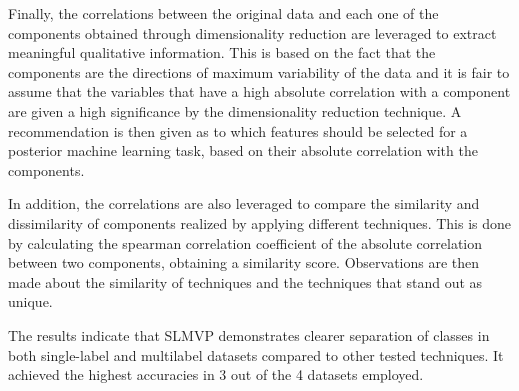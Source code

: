 Finally, the correlations between the original data and each one of the components obtained through dimensionality reduction  are leveraged to extract meaningful qualitative information. This is based on the fact that the components are the directions of maximum variability of the data and it is fair to assume that the variables that have a high absolute correlation with a component are given a high significance by the dimensionality reduction technique.
A recommendation is then given as to which features should be selected for a posterior machine learning task, based on their absolute correlation with the components.

In addition, the correlations are also leveraged to compare the similarity and dissimilarity of components realized by applying different techniques. This is done by calculating the spearman correlation coefficient of the absolute correlation between two components, obtaining a similarity score. Observations are then made about the similarity of techniques and the techniques that stand out as unique.

The results indicate that SLMVP demonstrates clearer separation of classes in both single-label and multilabel datasets compared to other tested techniques. It achieved the highest accuracies in 3 out of the 4 datasets employed.





